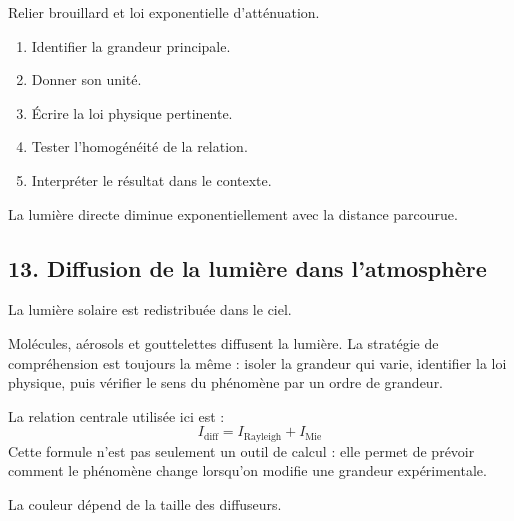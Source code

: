 \documentclass[11pt,a4paper]{article}
\begin{document}
\begin{exercicebox}
Relier brouillard et loi exponentielle d'atténuation.
\begin{enumerate}
  \item Identifier la grandeur principale.
  \item Donner son unité.
  \item Écrire la loi physique pertinente.
  \item Tester l'homogénéité de la relation.
  \item Interpréter le résultat dans le contexte.
\end{enumerate}
\end{exercicebox}

\begin{corrigebox}[Indication]
La lumière directe diminue exponentiellement avec la distance parcourue.
\end{corrigebox}


\subsection{13. Diffusion de la lumière dans l'atmosphère}

\begin{exemplebox}
La lumière solaire est redistribuée dans le ciel.
\end{exemplebox}

\begin{methodebox}
Molécules, aérosols et gouttelettes diffusent la lumière.
La stratégie de compréhension est toujours la même : isoler la grandeur qui varie, identifier la loi physique, puis vérifier le sens du phénomène par un ordre de grandeur.
\end{methodebox}

\begin{theorembox}
La relation centrale utilisée ici est :
\[
I_{\mathrm{diff}}=I_{\mathrm{Rayleigh}}+I_{\mathrm{Mie}}
\]
Cette formule n'est pas seulement un outil de calcul : elle permet de prévoir comment le phénomène change lorsqu'on modifie une grandeur expérimentale.
\end{theorembox}

\begin{odgbox}
La couleur dépend de la taille des diffuseurs.
\end{odgbox}
\end{document}
